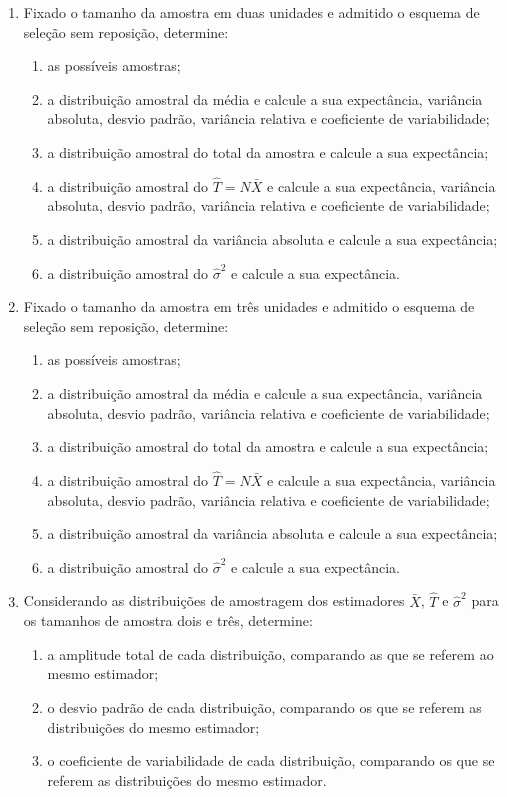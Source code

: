 \begin{enumerate}[resume]
\begin{enumerate}
	\item Fixado o tamanho da amostra em duas unidades e admitido o esquema de seleção sem reposição, determine:
		\begin{enumerate}
		\item as possíveis amostras;
		\item a distribuição amostral da média e calcule a sua expectância, variância absoluta, desvio padrão, variância relativa e coeficiente de variabilidade;
		\item a distribuição amostral do total da amostra e calcule a sua expectância;
		\item a distribuição amostral do $\hat{T} = N\bar{X}$ e calcule a sua expectância, variância absoluta, desvio padrão, variância relativa e coeficiente de variabilidade;
		\item a distribuição amostral da variância absoluta e calcule a sua expectância;
		\item a distribuição amostral do $\hat{\sigma}^{2}$ e calcule a sua expectância.
		\end{enumerate}

	\item Fixado o tamanho da amostra em três unidades e admitido o esquema de seleção sem reposição, determine:
		\begin{enumerate}
		\item as possíveis amostras;
		\item a distribuição amostral da média e calcule a sua expectância, variância absoluta, desvio padrão, variância relativa e coeficiente de variabilidade;
		\item a distribuição amostral do total da amostra e calcule a sua expectância;
		\item a distribuição amostral do $\hat{T} = N\bar{X}$ e calcule a sua expectância, variância absoluta, desvio padrão, variância relativa e coeficiente de variabilidade;
		\item a distribuição amostral da variância absoluta e calcule a sua expectância;
		\item a distribuição amostral do $\hat{\sigma}^{2}$ e calcule a sua expectância.
		\end{enumerate}
   	
		\item Considerando as distribuições de amostragem dos estimadores $\bar{X}$, $\hat{T}$ e $\hat{\sigma}^{2}$ para os tamanhos de amostra dois e três, determine:
		\begin{enumerate}   	
   		\item a amplitude total de cada distribuição, comparando as que se referem ao mesmo estimador;
		\item o desvio padrão de cada distribuição, comparando os que se referem as distribuições do mesmo estimador;
		\item o coeficiente de variabilidade de cada distribuição, comparando os que se referem as distribuições do mesmo estimador.
		\end{enumerate}
	\end{enumerate}
	

\end{enumerate}
